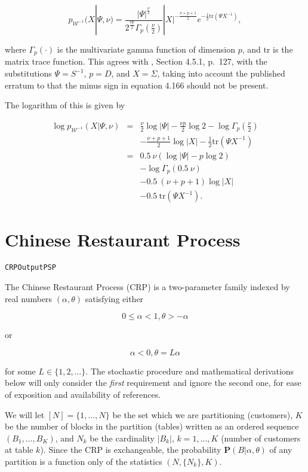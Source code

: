 \documentclass[12pt]{article}
\newcommand{\W}{\mathcal{W}}
\newcommand{\tr}{\mathrm{tr}}
\begin{document}
\[ p_{\W^{-1}}(X|\Psi, \nu) =
 \frac{|\Psi|^{\frac{\nu}{2}}}{2^{\frac{\nu p}{2}} \Gamma_p\left(\frac{\nu}{2}\right)}
 |X|^{-\frac{\nu + p + 1}{2}} e^{-\frac{1}{2} \tr(\Psi X^{-1})}, \]

where $\Gamma_p(\cdot)$ is the multivariate gamma function of
dimension $p$, and $\tr$ is the matrix trace function.  This agrees
with \cite{murphy}, Section 4.5.1, p.\ 127, with the substitutions
$\Psi = S^{-1}$, $p = D$, and $X = \Sigma$, taking into account the
published erratum to \cite{murphy} that the minus sign in equation
4.166 should not be present.

The logarithm of this is given by

\begin{eqnarray*}
 \log p_{\W^{-1}}(X|\Psi, \nu) & = &
 \frac{\nu}{2} \log |\Psi| - \frac{\nu p}{2} \log 2 - \log \Gamma_p \left(\frac{\nu}{2}\right) \\
 & & -\frac{\nu + p + 1}{2} \log |X| - \frac{1}{2}\tr(\Psi X^{-1}) \\
 & = & 0.5\ \nu\left( \log |\Psi| - p \log 2 \right) \\
 & & -\log \Gamma_p(0.5\ \nu) \\
 & & -0.5\ (\nu + p + 1) \log |X| \\
 & & -0.5\ \tr(\Psi X^{-1}).
\end{eqnarray*}

\section{Chinese Restaurant Process}

\texttt{CRPOutputPSP}

The Chinese Restaurant Process (CRP) is a two-parameter family indexed by
real numbers $(\alpha, \theta)$ satisfying either

\[
0 \le \alpha < 1, \theta > - \alpha
\]

or

\[
\alpha < 0, \theta = L\alpha
\]

for some $L \in \{1,2,\dots\}$. The stochastic procedure and mathematical
derivations below will only consider the \textit{first} requirement and
ignore the second one, for ease of exposition and availability of references.

We will let $[N] = \{1,\dots,N\}$ be the set which we are partitioning (customers),
$K$ be the number of blocks in the partition (tables) written as an ordered sequence
$(B_1,\dots,B_K)$, and $N_k$ be the cardinality $|B_k|$, $k = 1,\dots,K$
(number of customers at table $k$). Since the CRP is exchangeable, the probability
$\mathbf{P}(B|\alpha,\theta)$ of any partition is a function only of the statistics
$(N,\{N_k\},K)$.
\end{document}
